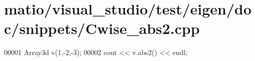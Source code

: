 \hypertarget{matio_2visual__studio_2test_2eigen_2doc_2snippets_2_cwise__abs2_8cpp_source}{}\section{matio/visual\+\_\+studio/test/eigen/doc/snippets/\+Cwise\+\_\+abs2.cpp}
\label{matio_2visual__studio_2test_2eigen_2doc_2snippets_2_cwise__abs2_8cpp_source}

\begin{DoxyCode}
00001 Array3d v(1,-2,-3);
00002 cout << v.abs2() << endl;
\end{DoxyCode}
